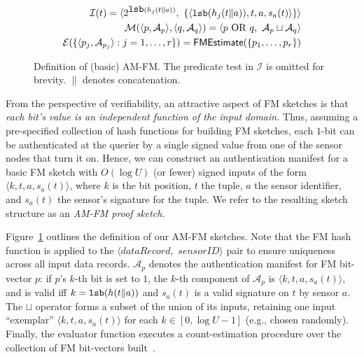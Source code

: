\documentclass[10pt,twocolumn]{article}
\newcommand{\amfm}{AM-FM\xspace}
\newcommand{\proofsketch}{proof sketch\xspace}
\newcommand{\am}{authentication manifest\xspace}
\newcommand{\sensorid}{\ensuremath{\mathit{sensorID}}\xspace}
\newcommand\vpar{{\vspace*{0.3em}}}
\newcommand{\stitle}[1]{\vpar\noindent{\bf #1\/}}
\newcommand{\lsb}{\mbox{\tt lsb}}
\newcommand{\fmestim}{{\sf FMEstimate}}
\begin{document}
\begin{figure}
{\small
\begin{eqnarray}
\mathcal{I}(t) =  \langle  2^{\lsb(h_j(t \| a))},\ \{\langle \lsb(h_j(t\|a)), t, a, s_a(t)\rangle \} \rangle   \nonumber \\
\mathcal{M}(\langle p, \mathcal{A}_p\rangle , \langle q, \mathcal{A}_q\rangle ) = \langle p\ \mathrm{OR}\ q,\
\mathcal{A}_p \sqcup \mathcal{A}_q\rangle   \nonumber \\
\mathcal{E}(\{\langle p_j, \mathcal{A}_{p_j}\rangle : j=1,\ldots,r\}) = 
\fmestim(\{p_1,\ldots, p_r\}) \label{eqn:AMFM-E}  \nonumber
\end{eqnarray}
}
\vspace*{-1.5em}
\caption{Definition of (basic) \amfm. The predicate test in $\mathcal{I}$ is omitted
  for brevity. $\|$ denotes concatenation.}
\label{fig:AM}
\vspace*{-2em}
\end{figure}

\stitle{Inflation-free FM.}
From the perspective of verifiability, an attractive aspect of FM
sketches is that {\em each bit's value is an independent function of the
input domain.}
Thus, assuming a pre-specified collection of hash functions 
for building FM sketches,
each $1$-bit can be authenticated at the querier by a single signed value 
from one of the sensor nodes that turn it on.  
Hence, we can construct an
\am for a basic FM sketch with $O(\log U)$ (or fewer) signed inputs of
the form $\langle k, t, a, s_a(t)\rangle $, where $k$ is the bit position, $t$ the
tuple, $a$ the sensor identifier, and $s_a(t)$ the sensor's signature
for the tuple.
We refer to the resulting sketch structure as an \emph{\amfm \proofsketch\/}.

Figure~\ref{fig:AM} outlines the definition 
of our \amfm sketches. 
Note that the FM hash function is applied to the 
$\langle \mathit{dataRecord},$ $\sensorid\rangle $ pair to ensure
uniqueness across all input data records.
$\mathcal{A}_p$ denotes the
authentication manifest for FM bit-vector $p$: if $p$'s $k$-th bit is
set to $1$, the $k$-th component of $\mathcal{A}_p$ is $\langle k,
t, a, s_a(t)\rangle $, and is valid iff $k = \lsb(h(t\|a))$ and
$s_a(t)$ is a valid signature on $t$ by sensor $a$.  The $\sqcup$
operator forms a subset of the union of its inputs, retaining one input
``exemplar'' $\langle k, t, a, s_a(t)\rangle $  for each $k \in [0, \log U -1]$ (e.g., chosen randomly).
Finally, the evaluator
function executes a 
count-estimation procedure over the collection of FM bit-vectors built~\cite{Ganguly2003,Gibbons2001SPAA}.
\end{document}
